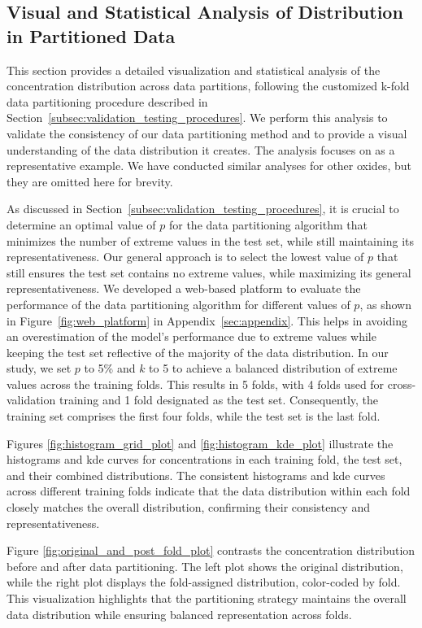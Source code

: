 \subsection{Visual and Statistical Analysis of  Distribution in Partitioned Data}\label{sec:visual_analysis}
This section provides a detailed visualization and statistical analysis of the  concentration distribution across data partitions, following the customized k-fold data partitioning procedure described in Section~\ref{subsec:validation_testing_procedures}.
We perform this analysis to validate the consistency of our data partitioning method and to provide a visual understanding of the data distribution it creates.
The analysis focuses on  as a representative example.
We have conducted similar analyses for other oxides, but they are omitted here for brevity.

As discussed in Section~\ref{subsec:validation_testing_procedures}, it is crucial to determine an optimal value of $p$ for the data partitioning algorithm that minimizes the number of extreme values in the test set, while still maintaining its representativeness.
Our general approach is to select the lowest value of $p$ that still ensures the test set contains no extreme values, while maximizing its general representativeness.
We developed a web-based platform to evaluate the performance of the data partitioning algorithm for different values of $p$, as shown in Figure~\ref{fig:web_platform} in Appendix~\ref{sec:appendix}.
This helps in avoiding an overestimation of the model's performance due to extreme values while keeping the test set reflective of the majority of the data distribution.
In our study, we set $p$ to 5\% and $k$ to 5 to achieve a balanced distribution of extreme values across the training folds.
This results in 5 folds, with 4 folds used for cross-validation training and 1 fold designated as the test set.
Consequently, the training set comprises the first four folds, while the test set is the last fold.

Figures \ref{fig:histogram_grid_plot} and \ref{fig:histogram_kde_plot} illustrate the histograms and \gls{kde} curves for  concentrations in each training fold, the test set, and their combined distributions.
The consistent histograms and \gls{kde} curves across different training folds indicate that the data distribution within each fold closely matches the overall distribution, confirming their consistency and representativeness.

Figure \ref{fig:original_and_post_fold_plot} contrasts the  concentration distribution before and after data partitioning.
The left plot shows the original distribution, while the right plot displays the fold-assigned distribution, color-coded by fold.
This visualization highlights that the partitioning strategy maintains the overall data distribution while ensuring balanced representation across folds.

